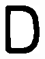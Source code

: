\documentclass[russian,utf8,emptystyle]{eskdtext}
\begin{document}
\begin{figure}[!htb]
\includegraphics[width=\linewidth]{../data/learn/d/001}
\endminipage\hfill
{}

\end{figure}
\end{document}

